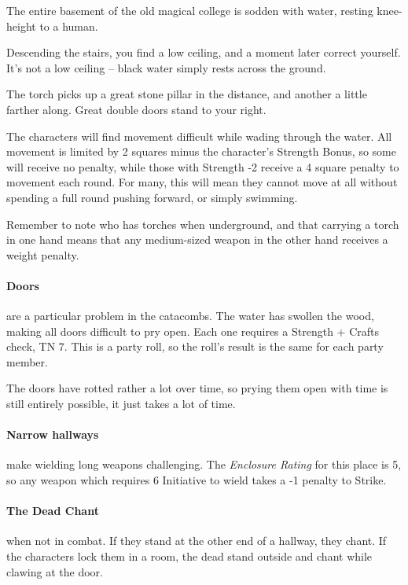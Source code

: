 \begin{multicols}{2}
The entire basement of the old magical college is sodden with water, resting knee-height to a human.

\begin{boxtext}
	Descending the stairs, you find a low ceiling, and a moment later correct yourself.  It's not a low ceiling -- black water simply rests across the ground.

	The torch picks up a great stone pillar in the distance, and another a little farther along.  Great double doors stand to your right.

\end{boxtext}

The characters will find movement difficult while wading through the water.  All movement is limited by 2 squares minus the character's Strength Bonus, so some will receive no penalty, while those with Strength -2 receive a 4 square penalty to movement each round.  For many, this will mean they cannot move at all without spending a full round pushing forward, or simply swimming.

Remember to note who has torches when underground, and that carrying a torch in one hand means that any medium-sized weapon in the other hand receives a weight penalty.

\paragraph{Doors} are a particular problem in the catacombs.  The water has swollen the wood, making all doors difficult to pry open.  Each one requires a Strength + Crafts check, TN 7.  This is a party roll, so the roll's result is the same for each party member.

The doors have rotted rather a lot over time, so prying them open with time is still entirely possible, it just takes a lot of time.

\paragraph{Narrow hallways}
make wielding long weapons challenging.
The \textit{Enclosure Rating} for this place is 5, so any weapon which requires 6 Initiative to wield takes a -1 penalty to Strike.

\paragraph{The Dead Chant} when not in combat.
If they stand at the other end of a hallway, they chant.
If the characters lock them in a room, the dead stand outside and chant while clawing at the door.


\end{multicols}
